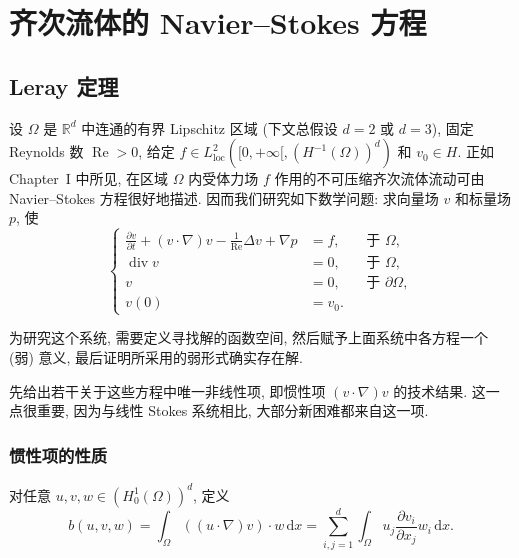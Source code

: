 \clearpage
\section{齐次流体的 Navier--Stokes 方程}
\label{chap:homogeneous-navier-stokes}
\renewcommand{\thestatement}{1.\arabic{statement}}
\setcounter{statement}{0}
\renewcommand{\thechapterfivesectiononeremark}{1.\arabic{chapterfivesectiononeremark}}

\subsection{Leray 定理}
\label{sec:chap5-leray-theorem}

设 $\Omega$ 是 $\mathbb R^d$ 中连通的有界 Lipschitz 区域 (下文总假设 $d=2$ 或 $d=3$), 固定 Reynolds 数 $\operatorname{Re}>0$, 给定
$f\in L_{\mathrm{loc}}^2([0,+\infty[,(H^{-1}(\Omega))^d)$ 和 $v_0\in H$. 正如 Chapter~I 中所见, 在区域 $\Omega$ 内受体力场 $f$ 作用的不可压缩齐次流体流动可由 Navier--Stokes 方程很好地描述. 因而我们研究如下数学问题: 求向量场 $v$ 和标量场 $p$, 使
\begin{equation}
\left\{
\begin{aligned}
 \frac{\partial v}{\partial t}+(v\cdot\nabla)v-\frac1{\operatorname{Re}}\Delta v+\nabla p&=f,&&\text{于 }\Omega,\\
 \operatorname{div}v&=0,&&\text{于 }\Omega,\\
 v&=0,&&\text{于 }\partial\Omega,\\
 v(0)&=v_0.
\end{aligned}
\right.
\label{eq:chap5-navier-stokes-system}
\end{equation}

为研究这个系统, 需要定义寻找解的函数空间, 然后赋予上面系统中各方程一个 (弱) 意义, 最后证明所采用的弱形式确实存在解.

先给出若干关于这些方程中唯一非线性项, 即惯性项 $(v\cdot\nabla)v$ 的技术结果. 这一点很重要, 因为与线性 Stokes 系统相比, 大部分新困难都来自这一项.

\subsubsection{惯性项的性质}
\label{subsec:chap5-inertia-properties}

对任意 $u,v,w\in(H_0^1(\Omega))^d$, 定义
\[
 b(u,v,w)=\int_\Omega((u\cdot\nabla)v)\cdot w\,\mathrm dx
 =\sum_{i,j=1}^d\int_\Omega u_j\frac{\partial v_i}{\partial x_j}w_i\,\mathrm dx.
\]


